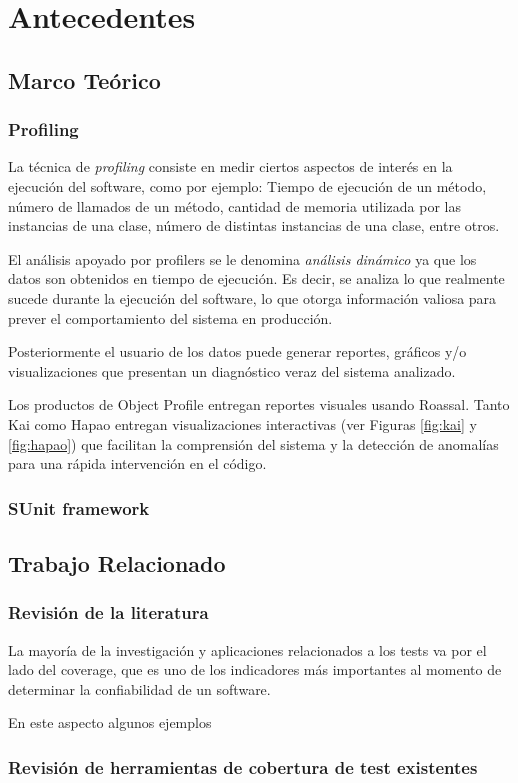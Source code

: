 \chapter{Antecedentes}


\section{Marco Teórico}

\subsection{Profiling}
\par La técnica de \emph{profiling} consiste en medir ciertos aspectos de interés en la ejecución del software, como por ejemplo: Tiempo de ejecución de un método, número de llamados de un método, cantidad de memoria utilizada por las instancias de una clase, número de distintas instancias de una clase, entre otros. 
\par El análisis apoyado por profilers se le denomina \emph{análisis dinámico} ya que los datos son obtenidos en tiempo de ejecución. Es decir, se analiza lo que realmente sucede durante la ejecución del software, lo que otorga información valiosa para prever el comportamiento del sistema en producción.
\par Posteriormente el usuario de los datos puede generar reportes, gráficos y/o visualizaciones que presentan un diagnóstico veraz del sistema analizado. 
\par Los productos de Object Profile  entregan reportes visuales usando Roassal. Tanto Kai como Hapao entregan visualizaciones interactivas (ver Figuras \ref{fig:kai} y \ref{fig:hapao}) que facilitan la comprensión del sistema y la detección de anomalías para una rápida intervención en el código.

\subsection{SUnit framework}

\section{Trabajo Relacionado}
\subsection{Revisión de la literatura}
\par La mayoría de la investigación y aplicaciones relacionados a los tests va por el lado del coverage, que es uno de los indicadores más importantes al momento de determinar la confiabilidad de un software. 
\par En este aspecto algunos ejemplos 

\subsection{Revisión de herramientas de cobertura de test existentes}
